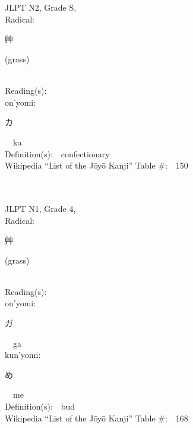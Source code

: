 \begin{multicols}{2}
\ \ \\
{\fontsize{34pt}{40pt}  }\ \ \\  %
{JLPT N2, Grade S, \\Radical:\ \ {\begin{CJK}{UTF8}{min} 艸 \end{CJK}} (grass) } \\
Reading(s):\ \ \\
{\hspace*{1em}}on'yomi:\ \ \\
{\hspace*{2em}}{\begin{CJK}{UTF8}{min} カ \end{CJK}}\ \ ka\ \ \\
Definition(s):\ \ confectionary \\
Wikipedia ``List of the J\=oy\=o Kanji'' Table \#:\ \ 150 \\
\ \ \\
{\fontsize{34pt}{40pt}  }\ \ \\  %
{JLPT N1, Grade 4, \\Radical:\ \ {\begin{CJK}{UTF8}{min} 艸 \end{CJK}} (grass) } \\
Reading(s):\ \ \\
{\hspace*{1em}}on'yomi:\ \ \\
{\hspace*{2em}}{\begin{CJK}{UTF8}{min} ガ \end{CJK}}\ \ ga\ \ \\
{\hspace*{1em}}kun'yomi:\ \ \\
{\hspace*{2em}}{\begin{CJK}{UTF8}{min} め \end{CJK}}\ \ me\ \ \\
Definition(s):\ \ bud \\
Wikipedia ``List of the J\=oy\=o Kanji'' Table \#:\ \ 168 \\
\ \ \\

\end{multicols}

